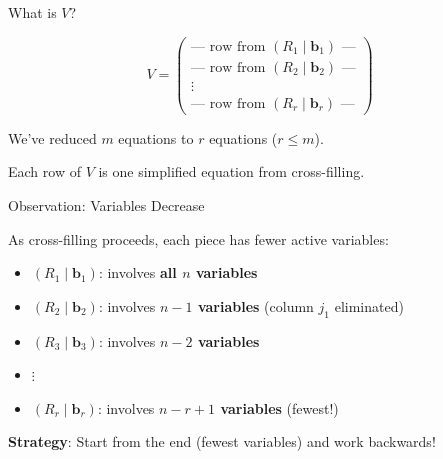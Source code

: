 \documentclass[10pt]{beamer}
\theoremstyle{definition}
\newcommand{\x}[1]{\alert{\textbf{#1}}}
\begin{document}
\begin{frame}{What is $V$?}

$$V = \begin{pmatrix}
\text{— row from } (R_1 \mid \mathbf{b}_1) \text{ —} \\
\text{— row from } (R_2 \mid \mathbf{b}_2) \text{ —} \\
\vdots \\
\text{— row from } (R_r \mid \mathbf{b}_r) \text{ —}
\end{pmatrix}$$

\vspace{1em}

We've reduced $m$ equations to $r$ equations ($r \leq m$).

\vspace{0.5em}

Each row of $V$ is one simplified equation from cross-filling.

\end{frame}

\begin{frame}{Observation: Variables Decrease}

As cross-filling proceeds, each piece has fewer active variables:

\begin{itemize}
\item $(R_1 \mid \mathbf{b}_1)$: involves \x{all $n$ variables}
\item $(R_2 \mid \mathbf{b}_2)$: involves \x{$n-1$ variables} (column $j_1$ eliminated)
\item $(R_3 \mid \mathbf{b}_3)$: involves \x{$n-2$ variables}
\item $\vdots$
\item $(R_r \mid \mathbf{b}_r)$: involves \x{$n-r+1$ variables} (fewest!)
\end{itemize}

\vspace{1em}

\x{Strategy}: Start from the end (fewest variables) and work backwards!

\end{frame}
\end{document}
